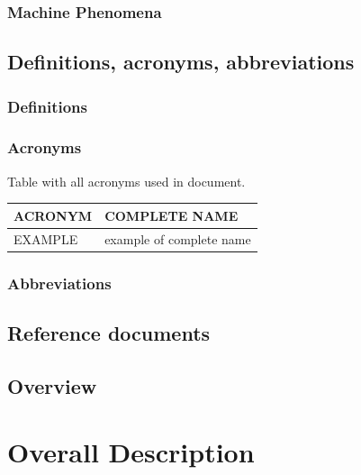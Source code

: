 \documentclass{article}
\begin{document}
\subsubsection{Machine Phenomena}

\subsection{Definitions, acronyms, abbreviations}
\subsubsection{Definitions}

\subsubsection{Acronyms}
Table with all acronyms used in document.
\begin{center}
\begin{tabular}{ | l | l |}
    \hline
    ACRONYM & COMPLETE NAME \\
    \hline
    EXAMPLE & example of complete name  \\
    \hline
\end{tabular}
\end{center}

\subsubsection{Abbreviations}


\subsection{Reference documents}
\subsubsection{}

\subsection{Overview}
\subsubsection{}

\section{Overall Description}
\end{document}
